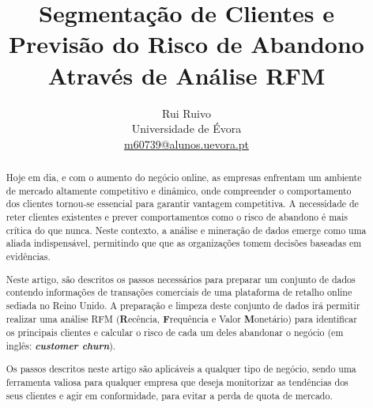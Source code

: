 \documentclass{easychair}
\begin{document}
\raggedbottom

\title{Segmentação de Clientes e Previsão do Risco de Abandono Através de Análise RFM}

\titlerunning{}

%

\author{Rui Ruivo\\
Universidade de Évora\\
\url{m60739@alunos.uevora.pt}\\
}


\maketitle

\begin{abstract}
Hoje em dia, e com o aumento do negócio online, as empresas enfrentam um ambiente de mercado altamente competitivo e dinâmico, onde compreender o comportamento dos clientes tornou-se essencial para garantir vantagem competitiva. A necessidade de reter clientes existentes e prever comportamentos como o risco de abandono é mais crítica do que nunca.
Neste contexto, a análise e mineração de dados emerge como uma aliada indispensável, permitindo que que as organizações tomem decisões baseadas em evidências.

Neste artigo, são descritos os passos necessários para preparar um conjunto de dados contendo informações de transações comerciais de uma plataforma de retalho online sediada no Reino Unido. A preparação e limpeza deste conjunto de dados irá permitir realizar uma análise RFM (\textbf{R}ecência, \textbf{F}requência e Valor \textbf{M}onetário) para identificar os principais clientes e calcular o risco de cada um deles abandonar o negócio (em inglês: \textbf{\textit{customer churn}}).

Os passos descritos neste artigo são aplicáveis a qualquer tipo de negócio, sendo uma ferramenta valiosa para qualquer empresa que deseja monitorizar as tendências dos seus clientes e agir em conformidade, para evitar a perda de quota de mercado.
\end{abstract}
\end{document}
